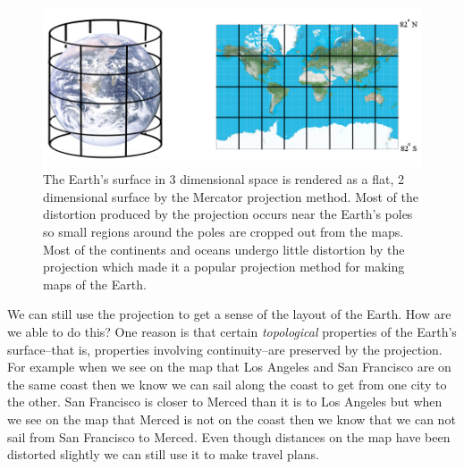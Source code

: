 \begin{figure}[h]
\centering
\includegraphics[scale=1.8]{./images/Mercator.jpg}
\caption[Scott Hotton's modification of an image from the Cartographic Research Lab at the University of Alabama.]{The Earth's surface in 3 dimensional space is rendered as a flat, 2
dimensional surface by the Mercator projection method. Most of the distortion
produced by the projection occurs near the Earth's poles so small regions 
around the poles are cropped out from the maps. Most of the continents and
oceans undergo little distortion by the projection which made it a popular 
projection method for making maps of the Earth.} 
\label{Mercator}
\end{figure}




   We can still use the projection to get a sense of the layout of the Earth. 
How are we able to do this?  One reason is that certain {\em topological} 
properties of the Earth's surface--that is, properties involving 
continuity--are preserved by the projection. For example when we see on the 
map that Los Angeles and San Francisco are on the same coast then we know we 
can sail along the coast to get from one city to the other. San Francisco is
closer to Merced than it is to Los Angeles but when we see on the map that 
Merced is not on the coast then we know that we can not sail from San Francisco 
to Merced. Even though distances on the map have been distorted slightly we 
can still use it to make travel plans. 

